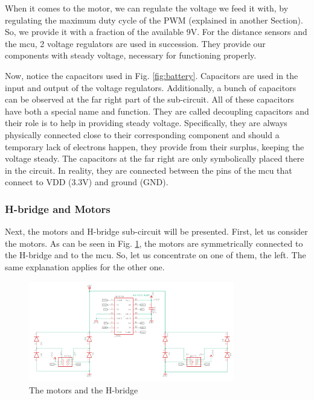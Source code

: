 \FloatBarrier

When it comes to the motor, we can regulate the voltage we feed it with, by regulating the maximum duty cycle of the PWM (explained in another Section). So, we provide it with a fraction of the available 9V.
For the distance sensors and the mcu, 2 voltage regulators are used in succession. They provide our components with steady voltage, necessary for functioning properly.

Now, notice the capacitors used in Fig. \ref{fig:battery}. Capacitors are used in the input and output of the voltage regulators. Additionally, a bunch of capacitors can be observed at the far right part of the sub-circuit.
All of these capacitors have both a special name and function. They are called decoupling capacitors and their role is to help in providing steady voltage. Specifically, they are always physically connected close to their corresponding component and should a temporary lack of electrons happen, they provide from their surplus, keeping the voltage steady.
The capacitors at the far right are only symbolically placed there in the circuit. In reality, they are connected between the pins of the mcu that connect to VDD (3.3V) and ground (GND).

\vspace{1cm}

\subsubsection{H-bridge and Motors}

Next, the motors and H-bridge sub-circuit will be presented. 
First, let us consider the motors. As can be seen in Fig. \ref{fig:motors}, the motors are symmetrically connected to the H-bridge and to the mcu. So, let us concentrate on one of them, the left. The same explanation applies for the other one.

\begin{figure}[htb]
    \centering
    \includegraphics[width=0.8\textwidth]{figures/hardware/MotorsandHBridge.PNG}
    \caption{The motors and the H-bridge}
    \label{fig:motors}
\end{figure}

